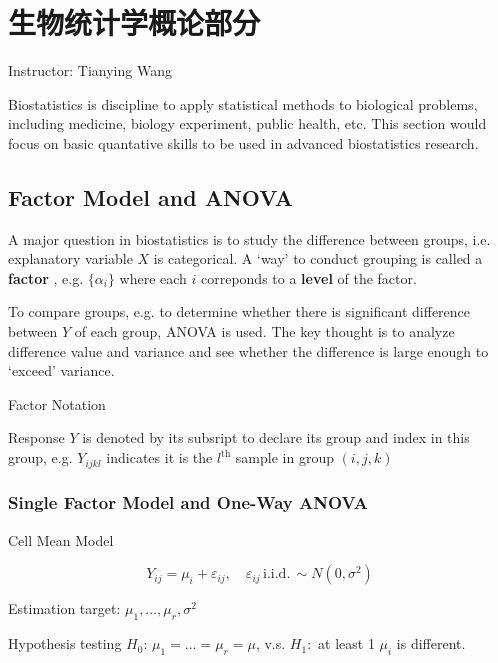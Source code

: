 \section{生物统计学概论部分}
\begin{center}
    Instructor: Tianying Wang
\end{center}

Biostatistics is discipline to apply statistical methods to biological problems, including medicine, biology experiment, public health, etc. This section would focus on basic quantative skills to be used in advanced biostatistics research.


\subsection{Factor Model and ANOVA}
A major question in biostatistics is to study the difference between groups, i.e. explanatory variable $ X $ is categorical. A `way' to conduct grouping is called a \textbf{factor} , e.g. $ \{\alpha _i\} $ where each $ i $ correponds to a \textbf{level} of the factor.  

To compare groups, e.g. to determine whether there is significant difference between $ Y $ of each group, ANOVA is used. The key thought is to analyze difference value and variance and see whether the difference is large enough to `exceed' variance.

\begin{point}
    Factor Notation
\end{point}

    Response $ Y $ is denoted by its subsript to declare its group and index in this group, e.g. $ Y_{ijkl} $ indicates it is the $ l^\mathrm{th}  $ sample in group $ (i,j,k) $

\subsubsection{Single Factor Model and One-Way ANOVA}

\begin{point}
    Cell Mean Model
\end{point}

\[
    Y_{ij}=\mu_i +\varepsilon _{ij},\quad \varepsilon _{ij} \,\mathrm{i.i.d.}\,\sim N(0,\sigma ^2) 
\]

Estimation target: $ \mu _1,\ldots,\mu _r,\sigma ^2 $

Hypothesis testing $ H_0 $: $ \mu _1=\ldots=\mu _r=\mu  $, v.s. $ H_1: $ at least 1 $ \mu _i $ is different.

